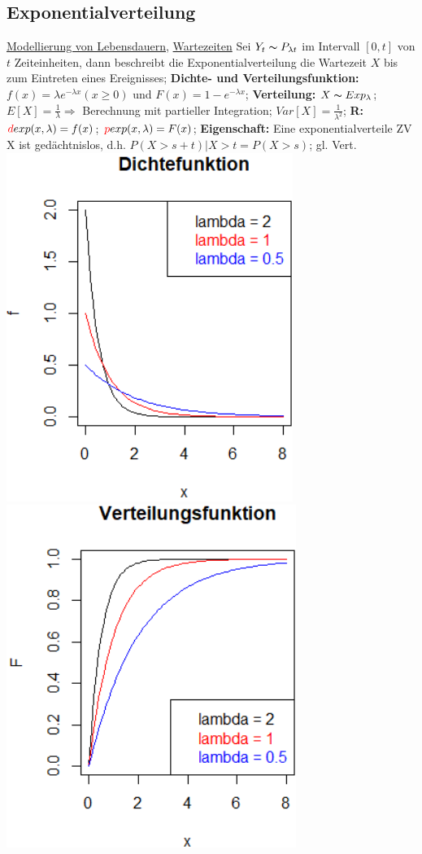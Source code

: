\subsection{Exponentialverteilung}
\underline{Modellierung von Lebensdauern,} \underline{Wartezeiten} Sei $ Y_{t} \thicksim P_{\lambda t} $ im Intervall $ [0,t] $  von $ t $  Zeiteinheiten, dann beschreibt die Exponentialverteilung die Wartezeit $ X $ bis zum Eintreten eines Ereignisses; 
\textbf{Dichte- und Verteilungsfunktion:} 
$ f(x) = \lambda e^{-\lambda x} (x \ge 0) $ und 
$ F(x) = 1 - e^{-\lambda x}$; 
\textbf{Verteilung:} 
$ X \thicksim Exp_{\lambda}$; 
$ E[X] = \frac{1}{\lambda} \Rightarrow$ Berechnung mit partieller Integration; 
$ Var[X] = \frac{1}{\lambda^2}$;
\textbf{R:} 
$ \textcolor{red}{d}exp(x,\lambda) = f(x)$; 
$ \textcolor{red}{p}exp(x,\lambda) = F(x)$; 
\textbf{Eigenschaft:} 
Eine exponentialverteile ZV X ist gedächtnislos, d.h. 
$ P(X > s + t) | X > t = P( X > s)$; 
gl. Vert.
\includegraphics[scale=0.25]{./pic/ExponentialverteilungDichtefunktion.png}
\includegraphics[scale=0.25]{./pic/ExponentialverteilungVerteilungsfunktion.png}
